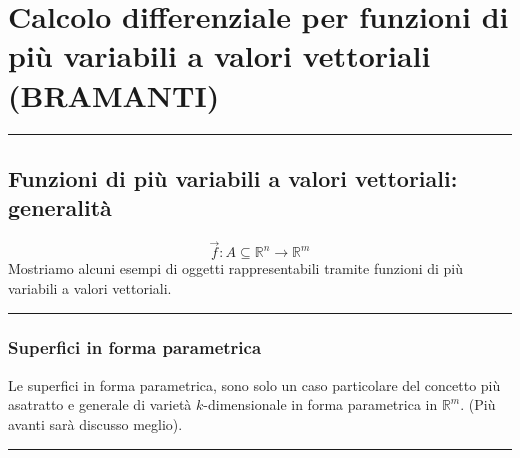 \section{Calcolo differenziale per funzioni di più variabili a valori vettoriali (BRAMANTI)}
\rule{\textwidth}{2pt}
\subsection{Funzioni di più variabili a valori vettoriali: generalità}
\[
    \vec{f}: A\subseteq \mathbb{R}^n \rightarrow  \mathbb{R}^m
\]
Mostriamo alcuni esempi di oggetti rappresentabili tramite funzioni di più variabili a valori vettoriali.\newline
\rule{\textwidth}{0,4pt}
\subsubsection{Superfici in forma parametrica}
Le superfici in forma parametrica, sono solo un caso particolare del concetto più asatratto e generale di varietà $k$-dimensionale in forma parametrica in $\mathbb{R}^m$. (Più avanti sarà discusso meglio).\newline
\rule{\textwidth}{0,4pt}
